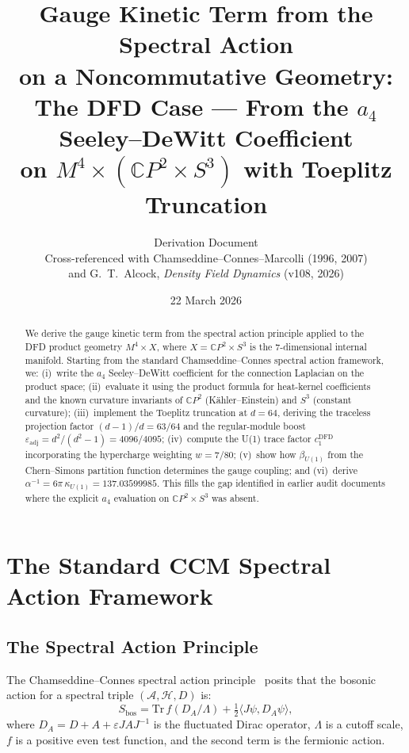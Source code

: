 \documentclass[12pt,a4paper]{article}
\title{Gauge Kinetic Term from the Spectral Action\\
on a Noncommutative Geometry:\\[6pt]
\large The DFD Case --- From the $a_4$ Seeley--DeWitt Coefficient\\
on $M^4 \times (\mathbb{C}P^2 \times S^3)$ with Toeplitz Truncation}
\author{Derivation Document\\[4pt]
Cross-referenced with Chamseddine--Connes--Marcolli (1996, 2007)\\
and G.~T.~Alcock, \textit{Density Field Dynamics} (v108, 2026)}
\date{22 March 2026}
\begin{document}
\maketitle

\begin{abstract}
We derive the gauge kinetic term from the spectral action principle applied
to the DFD product geometry $M^4 \times X$, where $X = \mathbb{C}P^2 \times S^3$
is the 7-dimensional internal manifold.  Starting from the standard
Chamseddine--Connes spectral action framework, we:
(i)~write the $a_4$ Seeley--DeWitt coefficient for the connection Laplacian
on the product space;
(ii)~evaluate it using the product formula for heat-kernel coefficients
and the known curvature invariants of $\mathbb{C}P^2$ (K\"ahler--Einstein)
and $S^3$ (constant curvature);
(iii)~implement the Toeplitz truncation at $d = 64$, deriving the traceless
projection factor $(d-1)/d = 63/64$ and the regular-module boost
$\varepsilon_{\mathrm{adj}} = d^2/(d^2-1) = 4096/4095$;
(iv)~compute the U(1) trace factor $c_1^{\mathrm{DFD}}$ incorporating the
hypercharge weighting $w = 7/80$;
(v)~show how $\beta_{U(1)}$ from the Chern--Simons partition function
determines the gauge coupling; and
(vi)~derive $\alpha^{-1} = 6\pi\,\kappa_{U(1)} = 137.03599985$.
This fills the gap identified in earlier audit documents where the
explicit $a_4$ evaluation on $\mathbb{C}P^2 \times S^3$ was absent.
\end{abstract}

\tableofcontents
\newpage

\section{The Standard CCM Spectral Action Framework}
\label{sec:ccm-framework}

\subsection{The Spectral Action Principle}

The Chamseddine--Connes spectral action principle~\cite{CC1996} posits that
the bosonic action for a spectral triple $(\mathcal{A}, \mathcal{H}, D)$ is:
\begin{equation}\label{eq:spectral-action}
S_{\mathrm{bos}} = \mathrm{Tr}\,f(D_A/\Lambda) + \tfrac{1}{2}\langle J\psi, D_A\psi\rangle,
\end{equation}
where $D_A = D + A + \varepsilon JAJ^{-1}$ is the fluctuated Dirac operator,
$\Lambda$ is a cutoff scale, $f$ is a positive even test function, and the
second term is the fermionic action.
\end{document}
